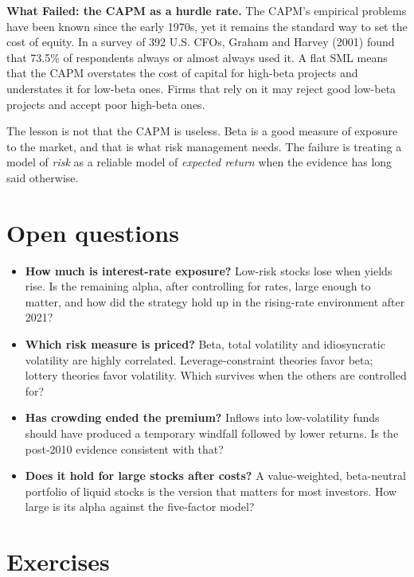 \begin{callout}
\textbf{What Failed: the CAPM as a hurdle rate.} The CAPM's empirical problems have been known since the early 1970s, yet it remains the standard way to set the cost of equity. In a survey of 392 U.S. CFOs, Graham and Harvey (2001) found that 73.5\% of respondents always or almost always used it. A flat SML means that the CAPM overstates the cost of capital for high-beta projects and understates it for low-beta ones. Firms that rely on it may reject good low-beta projects and accept poor high-beta ones.

The lesson is not that the CAPM is useless. Beta is a good measure of exposure to the market, and that is what risk management needs. The failure is treating a model of \emph{risk} as a reliable model of \emph{expected return} when the evidence has long said otherwise.
\end{callout}

\section{Open questions}
\label{sec:05-open}

\begin{itemize}
  \item \textbf{How much is interest-rate exposure?} Low-risk stocks lose when yields rise. Is the remaining alpha, after controlling for rates, large enough to matter, and how did the strategy hold up in the rising-rate environment after 2021?
  \item \textbf{Which risk measure is priced?} Beta, total volatility and idiosyncratic volatility are highly correlated. Leverage-constraint theories favor beta; lottery theories favor volatility. Which survives when the others are controlled for?
  \item \textbf{Has crowding ended the premium?} Inflows into low-volatility funds should have produced a temporary windfall followed by lower returns. Is the post-2010 evidence consistent with that?
  \item \textbf{Does it hold for large stocks after costs?} A value-weighted, beta-neutral portfolio of liquid stocks is the version that matters for most investors. How large is its alpha against the five-factor model?
\end{itemize}

\section*{Exercises}

